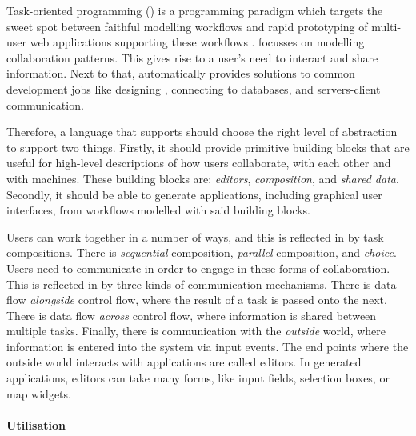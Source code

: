 Task-oriented programming (\TOP) is a programming paradigm which targets the sweet spot between faithful modelling workflows
and rapid prototyping of multi-user web applications supporting these workflows \cite{conf/ppdp/PlasmeijerLMAK12}.
\TOP focusses on modelling collaboration patterns.
This gives rise to a user's need to interact and share information.
Next to that, \TOP automatically provides solutions to common development jobs like designing , connecting to databases, and servers-client communication.

Therefore,
a language that supports \TOP should choose the right level of abstraction to support two things.
Firstly, it should provide primitive building blocks that are useful for high-level descriptions of how users collaborate,
with each other and with machines.
These building blocks are: \emph{editors}, \emph{composition}, and \emph{shared data}.
Secondly, it should be able to generate applications, including graphical user interfaces, from workflows modelled with said building blocks.

Users can work together in a number of ways, and this is reflected in \TOP by task compositions.
There is \emph{sequential} composition, \emph{parallel} composition, and \emph{choice}.
Users need to communicate in order to engage in these forms of collaboration.
This is reflected in \TOP by three kinds of communication mechanisms.
There is data flow \emph{alongside} control flow, where the result of a task is passed onto the next.
There is data flow \emph{across} control flow, where information is shared between multiple tasks.
Finally, there is communication with the \emph{outside} world, where information is entered into the system via input events.
The end points where the outside world interacts with \TOP applications are called editors.
In generated applications, editors can take many forms, like input fields, selection boxes, or map widgets.



\paragraph{Utilisation}


